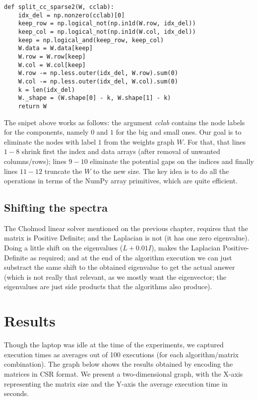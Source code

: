     \begin{lstlisting}
def split_cc_sparse2(W, cclab):
    idx_del = np.nonzero(cclab)[0]
    keep_row = np.logical_not(np.in1d(W.row, idx_del))
    keep_col = np.logical_not(np.in1d(W.col, idx_del))
    keep = np.logical_and(keep_row, keep_col)
    W.data = W.data[keep]
    W.row = W.row[keep]
    W.col = W.col[keep]
    W.row -= np.less.outer(idx_del, W.row).sum(0)
    W.col -= np.less.outer(idx_del, W.col).sum(0)
    k = len(idx_del)
    W._shape = (W.shape[0] - k, W.shape[1] - k)
    return W
    \end{lstlisting}

The snipet above works as follows: the argument
\emph{cclab} contains the node labels for the components, namely $0$ and $1$
for the big and small ones. Our goal is to eliminate the nodes with
label $1$ from the weights graph $W$. For that, that lines $1-8$
shrink first the index and data arrays (after removal of unwanted
columns/rows); lines $9-10$ eliminate the potential gaps on the
indices and finally lines $11-12$ truncate the $W$ to the new
size. The key idea is to do all the operations in terms of the NumPy
array primitives, which are quite efficient. 

\subsection{Shifting the spectra}

The Cholmod linear solver mentioned on the previous chapter, requires
that the matrix is Positive Definite; and the Laplacian is not (it has
one zero eigenvalue). Doing a little shift on the eigenvalues ($L +
0.01I$), makes the Laplacian Positive-Definite as required; and at the
end of the algorithm execution we can just substract the same shift to
the obtained eigenvalue to get the actual answer (which is not really
that relevant, as we mostly want the eigenvector; the eigenvalues are
just side products that the algorithms also produce). 

\section{Results}

Though the laptop was idle at the time of the experiments, we captured
execution times as averages out of 100 executions (for each
algorithm/matrix combination). The graph below shows the results
obtained by encoding the matrices in CSR format. We present a
two-dimensional graph, with the X-axis representing the matrix size
and the Y-axis the average execution time in seconds. 

